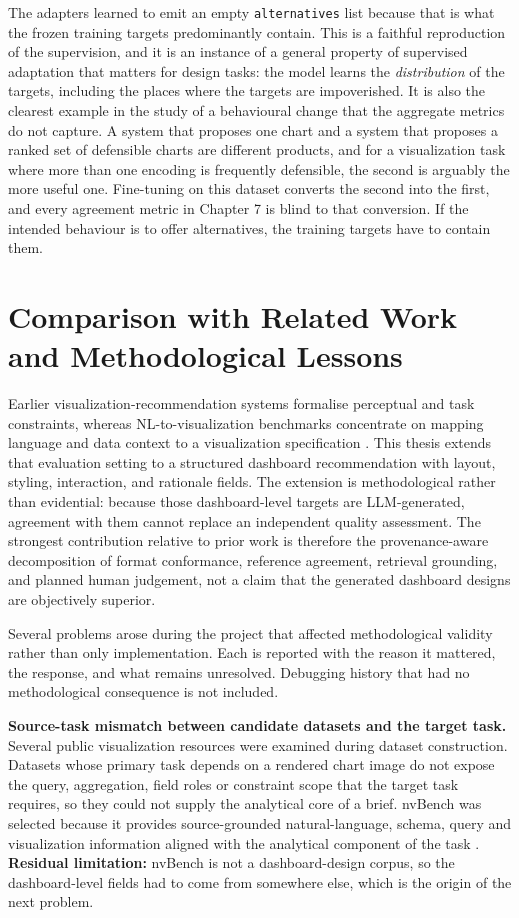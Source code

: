 The adapters learned to emit an empty \texttt{alternatives} list because that is what the frozen training targets predominantly contain. This is a faithful reproduction of the supervision, and it is an instance of a general property of supervised adaptation that matters for design tasks: the model learns the \emph{distribution} of the targets, including the places where the targets are impoverished. It is also the clearest example in the study of a behavioural change that the aggregate metrics do not capture. A system that proposes one chart and a system that proposes a ranked set of defensible charts are different products, and for a visualization task where more than one encoding is frequently defensible, the second is arguably the more useful one. Fine-tuning on this dataset converts the second into the first, and every agreement metric in Chapter 7 is blind to that conversion. If the intended behaviour is to offer alternatives, the training targets have to contain them.

\section{Comparison with Related Work and Methodological Lessons}

Earlier visualization-recommendation systems formalise perceptual and task constraints, whereas NL-to-visualization benchmarks concentrate on mapping language and data context to a visualization specification \cite{mackinlay1986apt,dibia2019data2vis,luo2021nvbenchsigmod}. This thesis extends that evaluation setting to a structured dashboard recommendation with layout, styling, interaction, and rationale fields. The extension is methodological rather than evidential: because those dashboard-level targets are LLM-generated, agreement with them cannot replace an independent quality assessment. The strongest contribution relative to prior work is therefore the provenance-aware decomposition of format conformance, reference agreement, retrieval grounding, and planned human judgement, not a claim that the generated dashboard designs are objectively superior.

Several problems arose during the project that affected methodological validity rather than only implementation. Each is reported with the reason it mattered, the response, and what remains unresolved. Debugging history that had no methodological consequence is not included.

\textbf{Source-task mismatch between candidate datasets and the target task.} Several public visualization resources were examined during dataset construction. Datasets whose primary task depends on a rendered chart image do not expose the query, aggregation, field roles or constraint scope that the target task requires, so they could not supply the analytical core of a brief. nvBench was selected because it provides source-grounded natural-language, schema, query and visualization information aligned with the analytical component of the task \cite{luo2021nvbenchsigmod}. \textbf{Residual limitation:} nvBench is not a dashboard-design corpus, so the dashboard-level fields had to come from somewhere else, which is the origin of the next problem.

